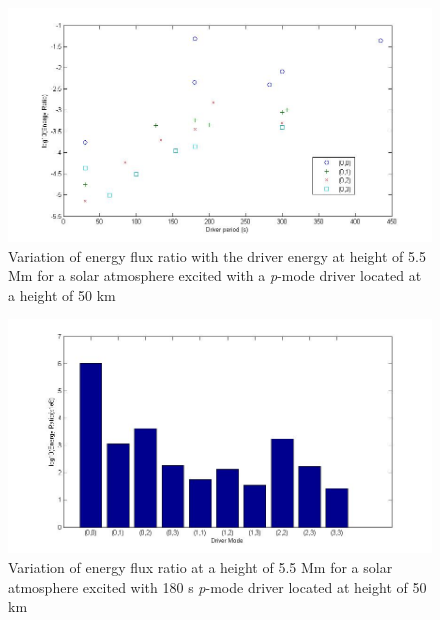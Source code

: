 \documentclass[preprint,authoryear,12pt]{elsarticle}
\begin{document}
\begin{figure}[t]
\includegraphics[scale=0.6]{imagesn/ratio_varoverdrve_eflux_vperiod_for_modes_5p5Mm.jpg}
\caption{Variation of energy flux ratio with the driver energy at height of 5.5 Mm for a solar atmosphere excited with a {\it p}-mode driver located at a height of 50 km}
\label{Fig17}
\end{figure}


\begin{figure}[t]
\includegraphics[scale=0.4]{imagesn/ratio_varoverdrve_eflux_vperiod_forallmodes_180s_5p5Mm.jpg}
\caption{Variation of energy flux ratio at a height of 5.5 Mm for a solar atmosphere excited with 180 s {\it p}-mode driver located 
at height of 50 km}
\label{Fig18}
\end{figure}
\end{document}
